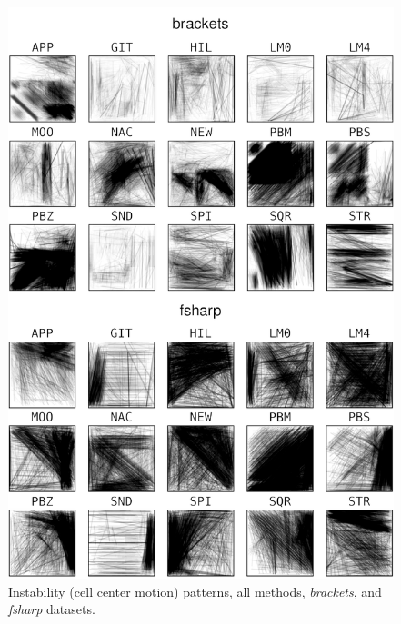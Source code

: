 \begin{figure}[htbp!]
  \includegraphics[width=\textwidth]{figures/treemap-algorithm/centroid-4b.png}
  \caption{Instability (cell center motion) patterns, all methods, \emph{brackets}, and \emph{fsharp} datasets.}
  \label{fig:centroids-b}
\end{figure}

